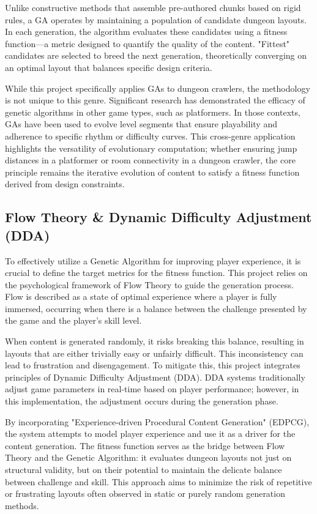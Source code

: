 Unlike constructive methods that assemble pre-authored chunks based on rigid rules, a GA operates by
maintaining a population of candidate dungeon layouts. In each generation, the algorithm evaluates these
candidates using a fitness function—a metric designed to quantify the quality of the content. "Fittest"
candidates are selected to breed the next generation, theoretically converging on an optimal layout that
balances specific design criteria.

While this project specifically applies GAs to dungeon crawlers, the methodology is not unique
to this genre. Significant research has demonstrated the efficacy of genetic algorithms in other
game types, such as platformers. In those contexts, GAs have been used to evolve level segments that
ensure playability and adherence to specific rhythm or difficulty curves. This cross-genre
application highlights the versatility of evolutionary computation; whether ensuring jump distances
in a platformer or room connectivity in a dungeon crawler, the core principle remains the iterative
evolution of content to satisfy a fitness function derived from design constraints.
\cite{Automatic_Game_world_with_GA} \cite{GA_in_games}

\subsection{Flow Theory \& Dynamic Difficulty Adjustment (DDA) }

To effectively utilize a Genetic Algorithm for improving player experience, it is crucial to define
the target metrics for the fitness function. This project relies on the psychological framework of Flow
Theory to guide the generation process. Flow is described as a state of optimal experience where a
player is fully immersed, occurring when there is a balance between the challenge presented by the
game and the player's skill level.

When content is generated randomly, it risks breaking this balance, resulting in layouts that are
either trivially easy or unfairly difficult. This inconsistency can lead to frustration and
disengagement. To mitigate this, this project integrates principles of Dynamic Difficulty
Adjustment (DDA). DDA systems traditionally adjust game parameters in real-time based on
player performance; however, in this implementation, the adjustment occurs during the generation phase.
\cite{Case_for_DDA} \cite{GA_for_Real-Time_DDA} \cite{DDA_Book}

By incorporating "Experience-driven Procedural Content Generation" (EDPCG), the system attempts
to model player experience and use it as a driver for the content generation. The fitness function
serves as the bridge between Flow Theory and the Genetic Algorithm: it evaluates dungeon layouts
not just on structural validity, but on their potential to maintain the delicate balance between
challenge and skill. This approach aims to minimize the risk of repetitive or frustrating layouts
often observed in static or purely random generation methods.
\cite{Experience_Driven_PCG}

